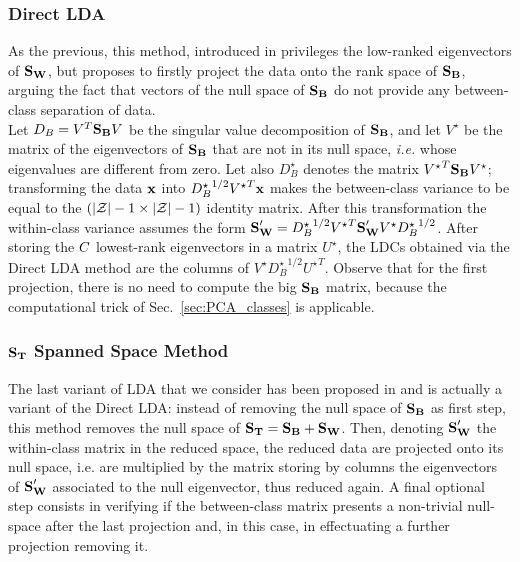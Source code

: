 \subsubsection{Direct LDA}
As the previous, this method, introduced in \cite{Yu01adirect} privileges the low-ranked eigenvectors of $\textbf{S}_{\textbf{W}}$, but proposes to firstly project the data onto the rank space of $\textbf{S}_{\textbf{B}}$, arguing the fact that vectors of the null space of $\textbf{S}_{\textbf{B}}$ do not provide any between-class separation of data. \\
Let $D_B=V^T\textbf{S}_{\textbf{B}} V$ be the singular value decomposition of $\textbf{S}_{\textbf{B}}$, and let $V^\star$ be the matrix of the eigenvectors of $\textbf{S}_{\textbf{B}}$ that are not in its null space, \textit{i.e.} whose eigenvalues are different from zero. Let also $D_B^\star$ denotes the matrix ${V^\star}^T\textbf{S}_{\textbf{B}} V^\star$; transforming the data $\textbf{x}$ into ${D_B^\star}^{1/2}{V^\star}^T\textbf{x}$ makes the between-class variance to be equal to   the $(\lvert \mathcal{Z} \rvert - 1 \times \lvert \mathcal{Z} \rvert - 1)$ identity matrix. After this transformation the within-class variance assumes the form $\textbf{S}_{\textbf{W}}' = {D_B^\star}^{1/2}{V^\star}^T\textbf{S}_{\textbf{W}} ' V^\star {D_B^\star}^{1/2}$. After storing the $C$ lowest-rank eigenvectors in a matrix $U^\star$, the LDCs obtained via the Direct LDA method are the columns of $V^\star{D_B^\star}^{1/2}{U^\star}^T$. Observe that for the first projection, there is no need to compute the big $\textbf{S}_{\textbf{B}}$ matrix, because the computational trick of Sec.~\ref{sec:PCA_classes} is applicable.


\subsubsection{$\textbf{S}_{\textbf{T}}$ Spanned Space Method}
The last variant of LDA that we consider has been proposed in \cite{huang} and is actually a variant of the Direct LDA: instead of removing the null space of $\textbf{S}_{\textbf{B}}$ as first step, this method removes the null space of $\textbf{S}_{\textbf{T}} = \textbf{S}_{\textbf{B}} + \textbf{S}_{\textbf{W}}$. Then, denoting $\textbf{S}_{\textbf{W}}'$ the within-class matrix in the reduced space, the reduced data are projected onto its null space, i.e. are multiplied by the matrix storing by columns the eigenvectors of $\textbf{S}_{\textbf{W}}'$ associated to the null eigenvector, thus reduced again. A final optional step consists in verifying if  the between-class matrix presents a non-trivial null-space after the last projection and, in this case, in effectuating a further projection removing it.




